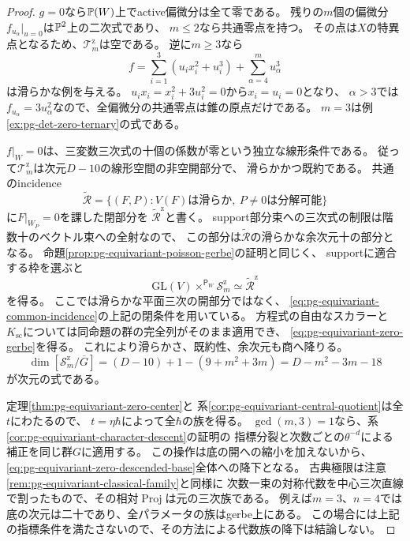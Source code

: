 \begin{proof}
$g=0$なら$\mathbb P(W)$上でactive偏微分は全て零である。
残りの$m$個の偏微分$f_{u_\alpha}|_{u=0}$は$\mathbb P^2$上の二次式であり、
$m\le2$なら共通零点を持つ。
その点は$X$の特異点となるため、$\mathcal T_m^{\mathrm z}$は空である。
逆に$m\ge3$なら
\begin{equation}
 f=\sum_{i=1}^3(u_ix_i^2+u_i^3)+\sum_{\alpha=4}^m u_\alpha^3
 \label{eq:pg-equivariant-zero-smooth-example}
\end{equation}
は滑らかな例を与える。
$u_ix_i=x_i^2+3u_i^2=0$から$x_i=u_i=0$となり、
$\alpha>3$では$f_{u_\alpha}=3u_\alpha^2$なので、全偏微分の共通零点は錐の原点だけである。
$m=3$は例\ref{ex:pg-det-zero-ternary}の式である。

$f|_W=0$は、三変数三次式の十個の係数が零という独立な線形条件である。
従って$\mathcal T_m^{\mathrm z}$は次元$D-10$の線形空間の非空開部分で、
滑らかかつ既約である。
共通のincidence
\begin{equation}
 \widetilde{\mathscr R}
 =\{(F,P):V(F)\text{は滑らか},\ P\ne0\text{は分解可能}\}
 \label{eq:pg-equivariant-common-incidence}
\end{equation}
に$F|_{W_P}=0$を課した閉部分を
$\widetilde{\mathscr R}^{\mathrm z}$と書く。
support部分束への三次式の制限は階数十のベクトル束への全射なので、
この部分は$\widetilde{\mathscr R}$の滑らかな余次元十の部分となる。
命題\ref{prop:pg-equivariant-poisson-gerbe}の証明と同じく、
supportに適合する枠を選ぶと
\begin{equation}
 \mathrm{GL}(V)\times^{\mathsf P_W}\mathscr S_m^{\mathrm z}
 \simeq\widetilde{\mathscr R}^{\mathrm z}
 \label{eq:pg-equivariant-zero-associated-incidence}
\end{equation}
を得る。
ここでは滑らかな平面三次の開部分ではなく、
\eqref{eq:pg-equivariant-common-incidence}の上記の閉条件を用いている。
方程式の自由なスカラーと$K_{\mathrm{sc}}$については同命題の群の完全列がそのまま適用でき、
\eqref{eq:pg-equivariant-zero-gerbe}を得る。
これにより滑らかさ、既約性、余次元も商へ降りる。
\begin{equation}
 \dim[\mathscr S_m^{\mathrm z}/\overline G]
 =(D-10)+1-(9+m^2+3m)=D-m^2-3m-18
 \label{eq:pg-equivariant-zero-dimension-count}
\end{equation}
が次元の式である。

定理\ref{thm:pg-equivariant-zero-center}と
系\ref{cor:pg-equivariant-central-quotient}は全$t$にわたるので、
$t=\eta\hbar$によって全$\hbar$の族を得る。
$\gcd(m,3)=1$なら、系\ref{cor:pg-equivariant-character-descent}の証明の
指標分裂と次数ごとの$\theta^{-d}$による補正を同じ群$G$に適用する。
この操作は底の開への縮小を加えないから、
\eqref{eq:pg-equivariant-zero-descended-base}全体への降下となる。
古典極限は注意\ref{rem:pg-equivariant-classical-family}と同様に
次数一束の対称代数を中心三次直線で割ったもので、その相対$\operatorname{Proj}$は元の三次族である。
例えば$m=3$、$n=4$では底の次元は二十であり、全パラメータの族はgerbe上にある。
この場合には上記の指標条件を満たさないので、その方法による代数族の降下は結論しない。
\end{proof}

